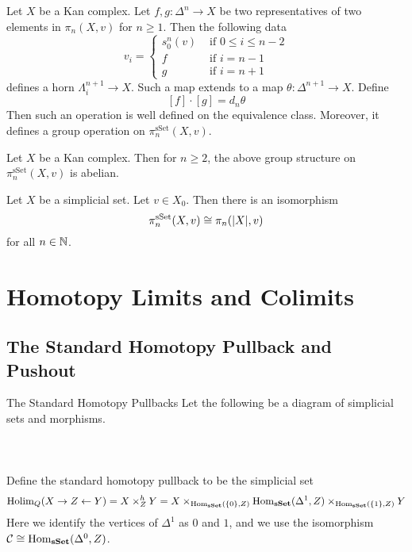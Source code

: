 \documentclass[a4paper]{article}
\begin{document}
\begin{thm}{}{} Let $X$ be a Kan complex. Let $f,g:\Delta^n\to X$ be two representatives of two elements in $\pi_n(X,v)$ for $n\geq 1$. Then the following data $$v_i=\begin{cases}
s_0^n(v) & \text{ if } 0\leq i\leq n-2\\
f & \text{ if } i=n-1\\
g & \text{ if } i=n+1
\end{cases}$$
defines a horn $\Lambda_i^{n+1}\to X$. Such a map extends to a map $\theta:\Delta^{n+1}\to X$. Define $$[f]\cdot[g]=d_n\theta$$ Then such an operation is well defined on the equivalence class. Moreover, it defines a group operation on $\pi_n^\text{sSet}(X,v)$. 
\end{thm}

\begin{thm}{}{} Let $X$ be a Kan complex. Then for $n\geq 2$, the above group structure on $\pi_n^\text{sSet}(X,v)$ is abelian. 
\end{thm}

\begin{thm}{}{} Let $X$ be a simplicial set. Let $v\in X_0$. Then there is an isomorphism $$\pi_n^\text{sSet}(X,v)\cong\pi_n(\abs{X},v)$$ for all $n\in\mathbb{N}$. 
\end{thm}

\pagebreak
\section{Homotopy Limits and Colimits}
\subsection{The Standard Homotopy Pullback and Pushout}
\begin{defn}{The Standard Homotopy Pullbacks}{} Let the following be a diagram of simplicial sets and morphisms. \\~\\
\\~\\
Define the standard homotopy pullback to be the simplicial set $$\text{Holim}_Q(X\rightarrow Z\leftarrow Y)=X\times_Z^hY=X\times_{\operatorname{Hom}_\bold{sSet}(\{0\},Z)}\operatorname{Hom}_\bold{sSet}(\Delta^1,Z)\times_{\operatorname{Hom}_\bold{sSet}(\{1\},Z)}Y$$ Here we identify the vertices of $\Delta^1$ as $0$ and $1$, and we use the isomorphism $\mathcal{C}\cong\operatorname{Hom}_\bold{sSet}(\Delta^0,Z)$. 
\end{defn}
\end{document}
